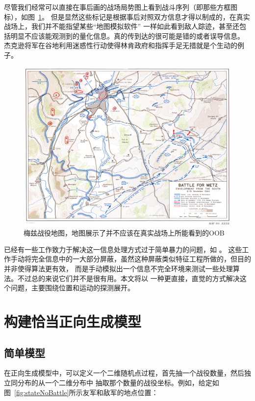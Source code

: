 \documentclass{article}
\begin{document}
尽管我们经常可以直接在事后画的战场局势图上看到战斗序列（即那些方框图标），如图~\ref{fig:metz}。
但是显然这些标记是根据事后对照双方信息才得以制成的，在真实战场上，我们并不能指望某些“地图模拟软件”
一样如此看到敌人踪迹，甚至还包括明显不应该能观测到的量化信息。真的传到达的很可能是错的或者误导信息。
杰克逊将军在谷地利用迷惑性行动使得林肯政府和指挥手足无措就是个生动的例子。


\begin{figure}[ht]
\includegraphics[width=0.6\linewidth]{metz.jpg}
\caption{
梅兹战役地图，地图展示了并不应该在真实战场上所能看到的OOB }
\label{fig:metz}
\end{figure}



已经有一些工作致力于解决这一信息处理方式过于简单暴力的问题，如
\cite{hostetler2012inferring} \cite{vsmejkal2016integrating} \cite{touhou}。
这些工作手动将完全信息中的一大部分屏蔽，虽然这种屏蔽类似特征工程所做的，但目的并非使得算法更有效，
而是手动模拟出一个信息不完全环境来测试一些处理算法。不过总的来说它们并不是很有用。本文将以
一种更直接，直觉的方式解决这个问题，主要围绕位置和运动的探测展开。

\section{构建恰当正向生成模型}

\subsection{简单模型}

在正向生成模型中，可以定义一个二维随机点过程，首先抽一个战役数量，然后独立同分布的从一个二维分布中
抽取那个数量的战役坐标。例如，给定如图~\ref{fig:stateNoBattle}所示友军和敌军的地点位置：
\end{document}
